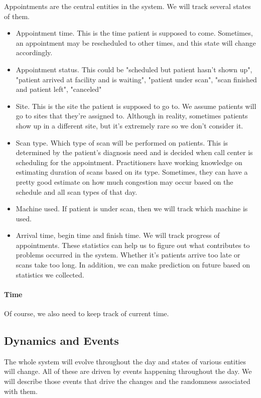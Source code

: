 Appointments are the central entities in the system. We will track several states of them.
\begin{itemize}
\item Appointment time. This is the time patient is supposed to come. Sometimes, an appointment may be rescheduled to other times, and this state will change accordingly.
\item Appointment status. This could be "scheduled but patient hasn't shown up", "patient arrived at facility and is waiting", "patient under scan", "scan finished and patient left", "canceled"
\item Site. This is the site the patient is supposed to go to. We assume patients will go to sites that they're assigned to. Although in reality, sometimes patients show up in a different site, but it's extremely rare so we don't consider it.
\item Scan type. Which type of scan will be performed on patients. This is determined by the patient's diagnosis need and is decided when call center is scheduling for the appointment. Practitioners have working knowledge on estimating duration of scans based on its type. Sometimes, they can have a pretty good estimate on how much congestion may occur based on the schedule and all scan types of that day.
\item Machine used. If patient is under scan, then we will track which machine is used.
\item Arrival time, begin time and finish time. We will track progress of appointments. These statistics can help us to figure out what contributes to problems occurred in the system. Whether it's patients arrive too late or scans take too long. In addition, we can make prediction on future based on statistics we collected.
\end{itemize}

\paragraph{Time} Of course, we also need to keep track of current time.


\subsection{Dynamics and Events}

The whole system will evolve throughout the day and states of various entities will change. All of these are driven by events happening throughout the day. We will describe those events that drive the changes and the randomness associated with them.


